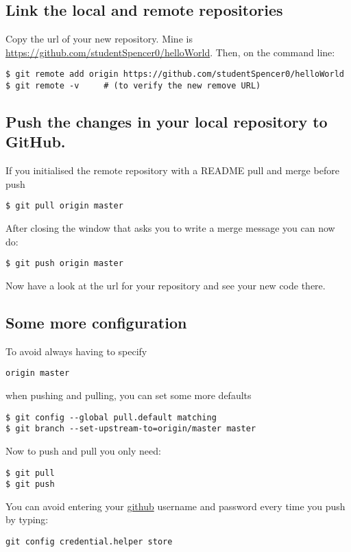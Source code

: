 \subsection{Link the local and remote repositories}

Copy the url of your new repository. Mine is \url{https://github.com/studentSpencer0/helloWorld}.
Then, on the command line:
\begin{lstlisting}
$ git remote add origin https://github.com/studentSpencer0/helloWorld
$ git remote -v     # (to verify the new remove URL)
\end{lstlisting}
\pause 


\subsection{Push the changes in your local repository to GitHub.}

If you initialised the remote repository with a README pull and merge
before push
\begin{lstlisting}
$ git pull origin master
\end{lstlisting}
After closing the window that asks you to write a merge message you
can now do:

\begin{lstlisting}
$ git push origin master
\end{lstlisting}
 Now have a look at the url for your repository and see your new code
there.

\clearpage{}


\subsection{Some more configuration}

To avoid always having to specify
\begin{lstlisting}
origin master
\end{lstlisting}
when pushing and pulling, you can set some more defaults
\begin{lstlisting}
$ git config --global pull.default matching
$ git branch --set-upstream-to=origin/master master
\end{lstlisting}
Now to push and pull you only need:
\begin{lstlisting}
$ git pull
$ git push
\end{lstlisting}
You can avoid entering your \url{github} username and password every
time you push by typing:
\begin{lstlisting}
git config credential.helper store
\end{lstlisting}
\pause 



